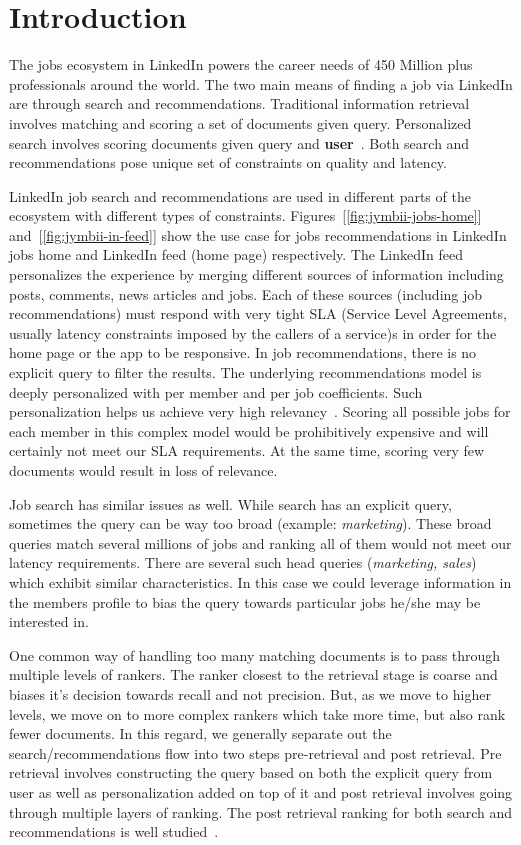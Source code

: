 \section{Introduction}
The jobs ecosystem in LinkedIn powers the career needs of 450 Million plus
professionals around the world. The two main means of finding a job via
LinkedIn are through search and recommendations. Traditional information
retrieval involves matching and scoring a set of documents given query.
Personalized search involves scoring documents given query and {\bf user}~\cite{liget}.  
Both search and recommendations pose unique set of constraints on quality and
latency.

LinkedIn job search and recommendations are used in different parts of the
ecosystem with different types of constraints. 
Figures~[\ref{fig:jymbii-jobs-home}] and~[\ref{fig:jymbii-in-feed}] show the
use case for jobs recommendations in LinkedIn jobs home and LinkedIn feed (home
page) respectively.
The LinkedIn
feed~\cite{agarwal2015personalizing} personalizes the experience by merging
different sources of information including posts, comments, news articles and
jobs. Each of these sources (including job recommendations) must respond with
very tight SLA (Service Level Agreements, usually latency constraints imposed
by the callers of a service)s in order for the home page or the app to be responsive.
In job recommendations, there is no explicit query to filter the results.
The underlying recommendations model is deeply personalized with per member and
per job coefficients. Such personalization helps us achieve very high
relevancy~\cite{zhang2016glmix}. Scoring all possible jobs for each member in
this complex model would be prohibitively expensive and will certainly not meet
our SLA requirements. At the same time, scoring very few documents would result
in loss of relevance. 

Job search has similar issues as well. While search has an explicit query,
sometimes the query can be way too broad (example: {\it marketing}).
These broad queries match several millions of jobs and ranking all of them
would not meet our latency requirements.
There are several such head queries ({\it marketing, sales}) which exhibit
similar characteristics.
In this case we
could leverage information in the members profile to bias the query towards
particular jobs he/she may be interested in.

One common way of handling too many matching documents is to pass through
multiple levels of rankers. The ranker closest to the retrieval stage is coarse
and biases it's decision towards recall and not precision. But, as we move to
higher levels, we move on to more complex rankers which take more time, but
also rank fewer documents. In this regard, we generally separate out the
search/recommendations flow into two steps pre-retrieval and post retrieval.
Pre retrieval involves constructing the query based on both the explicit query
from user as well as personalization added on top of it and post retrieval
involves going through multiple layers of ranking. The post retrieval ranking
for both search and recommendations is well studied~\cite{liu2009learning}. 

